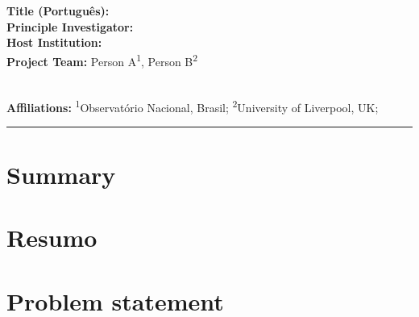 \documentclass[onecolumn,a4paper,11pt]{article}
\newcommand{\Team}{%
  Person A\textsuperscript{1},
  Person B\textsuperscript{2}
}
\newcommand{\Affiliations}{%
  \textsuperscript{1}Observatório Nacional, Brasil;
  \textsuperscript{2}University of Liverpool, UK;
}
\begin{document}
\begin{FlushLeft}
  \begin{spacing}{2}
    {\LARGE \textbf{\Title}}
  \end{spacing}
  \vspace{0.1cm}
  \textbf{Title (Português):} \TitlePt
  \\[0.1cm]
  \textbf{Principle Investigator:} \PIname
  \\[0.1cm]
  \textbf{Host Institution:} \Institution
  \\[0.1cm]
  \textbf{Project Team:} \Team
  \\[0.1cm]
  \textbf{Affiliations:} \Affiliations
\end{FlushLeft}

{\color{mediumblue}\hrule height 1pt}

\section*{\normalsize Summary}

\begingroup
   \small

  \lipsum[1-2]  %

  \par
\endgroup

\section*{\normalsize Resumo}

\begingroup
   \small

  \lipsum[1-2]  %

  \par
\endgroup

\section{Problem statement}
\end{document}
